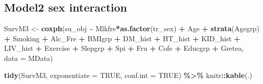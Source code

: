 \documentclass[
]{article}
\newenvironment{Shaded}{\begin{snugshade}}{\end{snugshade}}
\newcommand{\DataTypeTok}[1]{\textcolor[rgb]{0.13,0.29,0.53}{#1}}
\newcommand{\KeywordTok}[1]{\textcolor[rgb]{0.13,0.29,0.53}{\textbf{#1}}}
\newcommand{\NormalTok}[1]{#1}
\newcommand{\OperatorTok}[1]{\textcolor[rgb]{0.81,0.36,0.00}{\textbf{#1}}}
\newcommand{\OtherTok}[1]{\textcolor[rgb]{0.56,0.35,0.01}{#1}}
\newcommand{\StringTok}[1]{\textcolor[rgb]{0.31,0.60,0.02}{#1}}
\begin{document}
\hypertarget{model2-sex-interaction}{%
\subsection{Model2 sex interaction}\label{model2-sex-interaction}}

\begin{Shaded}
\begin{Highlighting}[]
\NormalTok{SurvM3 \textless{}{-}}\StringTok{  }\KeywordTok{coxph}\NormalTok{(su\_obj }\OperatorTok{\textasciitilde{}}\StringTok{ }\NormalTok{Mlkfre}\OperatorTok{*}\KeywordTok{as.factor}\NormalTok{(tr\_sex) }\OperatorTok{+}\StringTok{ }\NormalTok{Age }\OperatorTok{+}\StringTok{ }\KeywordTok{strata}\NormalTok{(Agegrp) }\OperatorTok{+}\StringTok{ }\NormalTok{Smoking }\OperatorTok{+}\StringTok{ }\NormalTok{Alc\_Fre }\OperatorTok{+}\StringTok{ }
\StringTok{                   }\NormalTok{BMIgrp }\OperatorTok{+}\StringTok{ }\NormalTok{DM\_hist }\OperatorTok{+}\StringTok{ }\NormalTok{HT\_hist }\OperatorTok{+}\StringTok{ }\NormalTok{KID\_hist }\OperatorTok{+}\StringTok{ }\NormalTok{LIV\_hist }\OperatorTok{+}\StringTok{ }\NormalTok{Exercise }\OperatorTok{+}\StringTok{ }
\StringTok{                   }\NormalTok{Slepgrp }\OperatorTok{+}\StringTok{ }\NormalTok{Spi }\OperatorTok{+}\StringTok{ }\NormalTok{Fru }\OperatorTok{+}\StringTok{ }\NormalTok{Cofe }\OperatorTok{+}\StringTok{ }\NormalTok{Educgrp }\OperatorTok{+}\StringTok{ }\NormalTok{Gretea, }
                 \DataTypeTok{data =}\NormalTok{ MData)}

\KeywordTok{tidy}\NormalTok{(SurvM3, }\DataTypeTok{exponentiate =} \OtherTok{TRUE}\NormalTok{, }\DataTypeTok{conf.int =} \OtherTok{TRUE}\NormalTok{) }\OperatorTok{\%\textgreater{}\%}\StringTok{ }
\StringTok{  }\NormalTok{knitr}\OperatorTok{::}\KeywordTok{kable}\NormalTok{(.)}
\end{Highlighting}
\end{Shaded}
\end{document}
